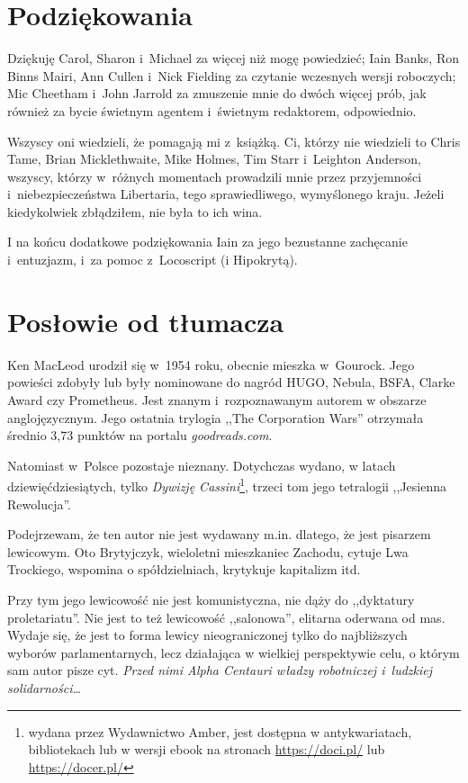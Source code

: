 \documentclass[oneside,polish,11pt,sfheadings]{mwbk}
\begin{document}
\chapter*{Podziękowania}

Dziękuję Carol, Sharon i~Michael za więcej niż mogę powiedzieć; Iain
Banks, Ron Binns Mairi, Ann Cullen i~Nick Fielding za czytanie wczesnych
wersji roboczych; Mic Cheetham i~John Jarrold za zmuszenie mnie do dwóch
więcej prób, jak również za bycie świetnym agentem i~świetnym
redaktorem, odpowiednio.

Wszyscy oni wiedzieli, że pomagają mi z~książką. Ci, którzy nie
wiedzieli to Chris Tame, Brian Micklethwaite, Mike Holmes, Tim Starr i~Leighton Anderson, wszyscy, którzy w~różnych momentach prowadzili mnie
przez przyjemności i~niebezpieczeństwa Libertaria, tego sprawiedliwego,
wymyślonego kraju. Jeżeli kiedykolwiek zbłądziłem, nie była to ich wina.

I na końcu dodatkowe podziękowania Iain za jego bezustanne zachęcanie i~entuzjazm, i~za pomoc z~Locoscript (i Hipokrytą).

\chapter*{Posłowie od tłumacza}

Ken MacLeod urodził się w~1954 roku, obecnie mieszka w~Gourock. Jego powieści zdobyły lub były nominowane do nagród HU\-GO, Nebula, BSFA,  Clarke Award czy Prometheus. Jest znanym i~rozpoznawanym autorem w obszarze anglojęzycznym. Jego ostatnia trylogia ,,The Corporation Wars'' otrzymała średnio 3,73 punktów na portalu \emph{goodreads.com}.

Natomiast w~Polsce pozostaje nieznany. Dotychczas wydano, w latach dziewięćdziesiątych, tylko \emph{Dywizję Cassini}\footnote{ wydana przez Wydawnictwo Amber, jest dostępna w antykwariatach, bibliotekach lub w wersji ebook na stronach \url{https://doci.pl/} lub \url{https://docer.pl/}}, trzeci tom jego tetralogii ,,Jesienna Rewolucja''. 

Podejrzewam, że ten autor nie jest wydawany m.in. dlatego, że jest pisarzem lewicowym. Oto Brytyjczyk, wieloletni mieszkaniec Zachodu, cytuje Lwa Trockiego, wspomina o spółdzielniach, krytykuje kapitalizm itd. 

Przy tym jego lewicowość nie jest komunistyczna, nie dąży do ,,dyktatury proletariatu''. Nie jest to też lewicowość ,,salonowa'', elitarna oderwana od mas. Wydaje się, że jest to forma lewicy nieograniczonej tylko do najbliższych wyborów parlamentarnych, lecz działająca w wielkiej perspektywie celu, o którym sam autor pisze cyt. \emph{Przed nimi Alpha Centauri władzy robotniczej i~ludzkiej solidarności\dots}
\end{document}
